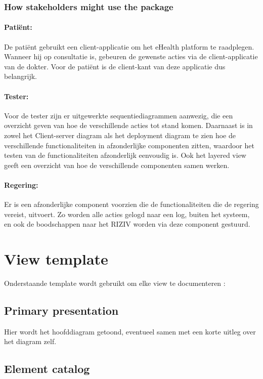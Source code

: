 \documentclass[a4paper,10pt]{article}
\begin{document}
\subsubsection{How stakeholders might use the package}

\paragraph{Patiënt:}
De patiënt gebruikt een client-applicatie om het eHealth platform te raadplegen. Wanneer hij op consultatie is, gebeuren de gewenste acties via de client-applicatie van de dokter. Voor de patiënt is de client-kant van deze applicatie dus belangrijk.

\paragraph{Tester:}
Voor de tester zijn er uitgewerkte sequentiediagrammen aanwezig, die een overzicht geven van hoe de verschillende acties tot stand komen. Daarnaast is in zowel het Client-server diagram als het deployment diagram te zien hoe de verschillende functionaliteiten in afzonderlijke componenten zitten, waardoor het testen van de functionaliteiten afzonderlijk eenvoudig is. Ook het layered view geeft een overzicht van hoe de verschillende componenten samen werken.

\paragraph{Regering:}
Er is een afzonderlijke component voorzien die de functionaliteiten die de regering vereist, uitvoert. Zo worden alle acties gelogd naar een log, buiten het systeem, en ook de boodschappen naar het RIZIV worden via deze component gestuurd. 

\clearpage
\section{View template}

Onderstaande template wordt gebruikt om elke view te documenteren : 
\subsection{Primary presentation}
Hier wordt het hoofddiagram getoond, eventueel samen met een korte uitleg over het diagram zelf.
\subsection{Element catalog}
\end{document}
